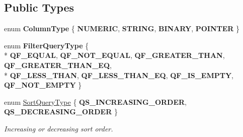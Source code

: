 \subsection*{Public Types}
\begin{DoxyCompactItemize}
\item 
enum {\bfseries Column\-Type} \{ {\bfseries N\-U\-M\-E\-R\-I\-C}, 
{\bfseries S\-T\-R\-I\-N\-G}, 
{\bfseries B\-I\-N\-A\-R\-Y}, 
{\bfseries P\-O\-I\-N\-T\-E\-R}
 \}
\item 
enum {\bfseries Filter\-Query\-Type} \{ \\*
{\bfseries Q\-F\-\_\-\-E\-Q\-U\-A\-L}, 
{\bfseries Q\-F\-\_\-\-N\-O\-T\-\_\-\-E\-Q\-U\-A\-L}, 
{\bfseries Q\-F\-\_\-\-G\-R\-E\-A\-T\-E\-R\-\_\-\-T\-H\-A\-N}, 
{\bfseries Q\-F\-\_\-\-G\-R\-E\-A\-T\-E\-R\-\_\-\-T\-H\-A\-N\-\_\-\-E\-Q}, 
\\*
{\bfseries Q\-F\-\_\-\-L\-E\-S\-S\-\_\-\-T\-H\-A\-N}, 
{\bfseries Q\-F\-\_\-\-L\-E\-S\-S\-\_\-\-T\-H\-A\-N\-\_\-\-E\-Q}, 
{\bfseries Q\-F\-\_\-\-I\-S\-\_\-\-E\-M\-P\-T\-Y}, 
{\bfseries Q\-F\-\_\-\-N\-O\-T\-\_\-\-E\-M\-P\-T\-Y}
 \}
\item 
enum \hyperlink{class_data_structures_1_1_table_a736b2ab44bd8d4159bad88d4ae04665d}{Sort\-Query\-Type} \{ {\bfseries Q\-S\-\_\-\-I\-N\-C\-R\-E\-A\-S\-I\-N\-G\-\_\-\-O\-R\-D\-E\-R}, 
{\bfseries Q\-S\-\_\-\-D\-E\-C\-R\-E\-A\-S\-I\-N\-G\-\_\-\-O\-R\-D\-E\-R}
 \}
\begin{DoxyCompactList}\small\item\em Increasing or decreasing sort order. \end{DoxyCompactList}\end{DoxyCompactItemize}
